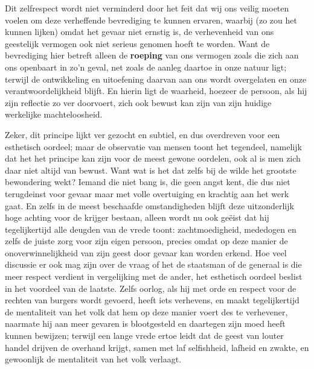 Dit zelfrespect wordt niet verminderd door het feit dat wij ons veilig moeten voelen om deze verheffende bevrediging te kunnen ervaren, waarbij (zo zou het kunnen lijken) omdat het gevaar niet ernstig is, de verhevenheid van ons geestelijk vermogen ook niet serieus genomen hoeft te worden. Want de bevrediging hier betreft alleen de \textbf{roeping} van ons vermogen zoals die zich aan ons openbaart in zo’n geval, net zoals de aanleg daartoe in onze natuur ligt; terwijl de ontwikkeling en uitoefening daarvan aan ons wordt overgelaten en onze verantwoordelijkheid blijft. En hierin ligt de waarheid, hoezeer de persoon, als hij zijn reflectie zo ver doorvoert, zich ook bewust kan zijn van zijn huidige werkelijke machteloosheid.

Zeker, dit principe lijkt ver gezocht en subtiel, en dus overdreven voor een esthetisch oordeel; maar de observatie van mensen toont het tegendeel, namelijk dat het het principe kan zijn voor de meest gewone oordelen, ook al is men zich daar niet altijd van bewust. Want wat is het dat zelfs bij de wilde het grootste bewondering wekt? Iemand die niet bang is, die geen angst kent, die dus niet terugdeinst voor gevaar maar met volle overtuiging en krachtig aan het werk gaat. En zelfs in de meest beschaafde omstandigheden blijft deze uitzonderlijk hoge achting voor de krijger bestaan, alleen wordt nu ook geëist dat hij tegelijkertijd alle deugden van de vrede toont: zachtmoedigheid, mededogen en zelfs de juiste zorg voor zijn eigen persoon, precies omdat op deze manier de onoverwinnelijkheid van zijn geest door gevaar kan worden erkend. Hoe veel discussie er ook mag zijn over de vraag of het de staatsman of de generaal is die meer respect verdient in vergelijking met de ander, het esthetisch oordeel beslist in het voordeel van de laatste. Zelfs oorlog, als hij met orde en respect voor de rechten van burgers wordt gevoerd, heeft iets verhevens, en maakt tegelijkertijd de mentaliteit van het volk dat hem op deze manier voert des te verhevener, naarmate hij aan meer gevaren is blootgesteld en daartegen zijn moed heeft kunnen bewijzen; terwijl een lange vrede ertoe leidt dat de geest van louter handel drijven de overhand krijgt, samen met laf selﬁshheid, lafheid en zwakte, en gewoonlijk de mentaliteit van het volk verlaagt.

